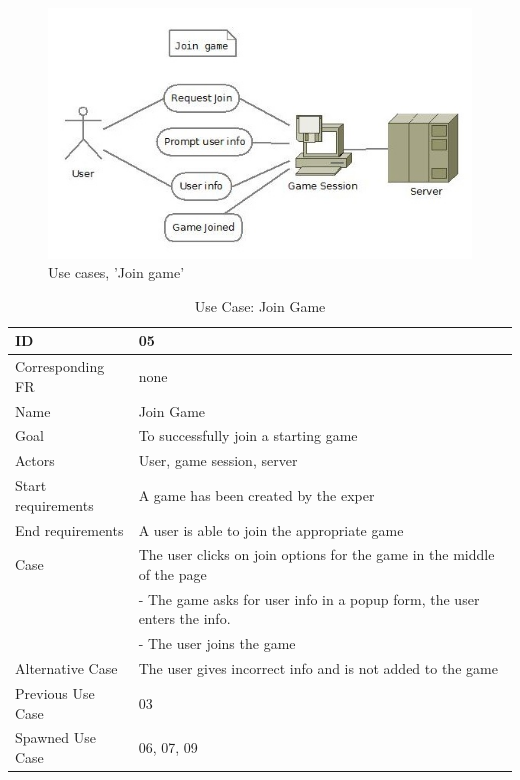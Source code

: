 \begin{figure}[H]
  \centering
    \includegraphics[width=1.0\textwidth]{img/joingame.jpg}
  \caption{Use cases, 'Join game'} 
  \label{fig:joingame}
\end{figure}


\begin{table}[H]
\begin{tabular}{|l|p{14cm}|}
\hline
	\textbf{ID} & \textbf{05}\\ \hline
	Corresponding FR & none\\ \hline
	Name & Join Game\\ \hline
	Goal & To successfully join a starting game\\ \hline
	Actors & User, game session, server \\ \hline
	Start requirements & A game has been created by the exper\\ \hline
	End requirements & A user is able to join the appropriate game\\ \hline
	Case & The user clicks on join options for the game in the middle of the page\\
			& - The game asks for user info in a popup form, the user enters the info. \\
			& - The user joins the game \\ \hline
	Alternative Case & The user gives incorrect info and is not added to the game \\ \hline
	Previous Use Case & 03 \\ \hline
	Spawned Use Case & 06, 07, 09\\ \hline
\end{tabular}
\caption{Use Case: Join Game}
\label{fig:usecase05table}
\end{table}


